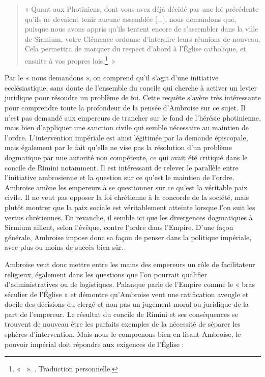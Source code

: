 \bigskip

\begin{quote}
    « Quant aux Photiniens, dont vous avez déjà décidé par une loi précédente qu'ils ne devaient tenir aucune assemblée [...], nous demandons que, puisque nous avons appris qu'ils tentent encore de s'assembler dans la ville de Sirmium, votre Clémence ordonne d'interdire leurs réunions de nouveau. Cela permettra de marquer du respect d'abord à l'Église catholique, et ensuite à vos propres lois.\footnote{« ~». \cite[\nopp ec. 4, 12]{ambroise_csel_82_3}. Traduction personnelle.}~»
\end{quote}

\bigskip

Par le « nous demandons », on comprend qu'il s'agit d'une initiative ecclésiastique, sans doute de l'ensemble du concile qui cherche à activer un levier juridique pour résoudre un problème de foi. Cette requête s'avère très intéressante pour comprendre toute la profondeur de la pensée d'Ambroise sur ce sujet. Il n'est pas demandé aux empereurs de trancher sur le fond de l'hérésie photinienne, mais bien d'appliquer une sanction civile qui semble nécessaire au maintien de l'ordre. L'intervention impériale est ainsi légitimée par la demande épiscopale, mais également par le fait qu'elle ne vise pas la résolution d'un problème dogmatique par une autorité non compétente, ce qui avait été critiqué dans le concile de Rimini notamment. Il est intéressant de relever le parallèle entre l'initiative ambrosienne et la question sur ce qu'est le maintien de l'ordre. Ambroise amène les empereurs à se questionner sur ce qu'est la véritable paix civile. Il ne veut pas opposer la foi chrétienne à la concorde de la société, mais plutôt montrer que la paix sociale est véritablement atteinte lorsque l'on suit les vertus chrétiennes. En revanche, il semble ici que les divergences dogmatiques à Sirmium aillent, selon l'évêque, contre l'ordre dans l'Empire. D'une façon générale, Ambroise impose donc sa façon de penser dans la politique impériale, avec plus ou moins de succès bien sûr.

\bigskip

Ambroise veut donc mettre entre les mains des empereurs un rôle de facilitateur religieux, également dans les questions que l'on pourrait qualifier d'administratives ou de logistiques. Palanque parle de l'Empire comme le « bras séculier de l'Église » et démontre qu'Ambroise veut une ratification aveugle et docile des décisions du clergé et non pas un jugement moral ou juridique de la part de l'empereur\autocite[372]{palanque_ambroise}. Le résultat du concile de Rimini et ses conséquences se trouvent de nouveau être les parfaits exemples de la nécessité de séparer les sphères d'intervention. Mais nous le comprenons bien en lisant Ambroise, le pouvoir impérial doit répondre aux exigences de l'Église :


